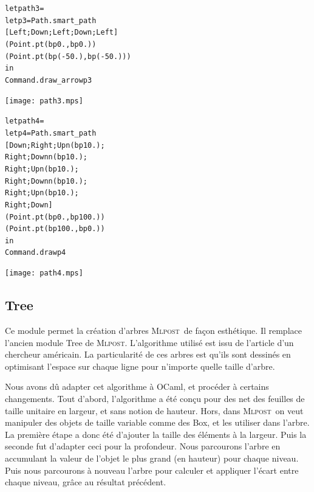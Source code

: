 \documentclass[a4paper,12pt]{article}
\newcommand{\mlpost}{\textsc{Mlpost}}
\begin{document}
\bigskip
\begin{minipage}{0.5\linewidth}
  \begin{alltt}
    let path3 = 
    let p3 = Path.smart_path 
    [Left;Down;Left;Down;Left] 
    (Point.pt (bp 0.,bp 0.)) 
    (Point.pt (bp (-50.),bp (-50.)))
    in
    Command.draw_arrow p3
  \end{alltt}
\end{minipage}
\begin{minipage}{0.5\linewidth}
\begin{center}
\texttt{[image: path3.mps]}
\end{center}
\end{minipage}

\bigskip
\begin{minipage}{0.5\linewidth}
  \begin{alltt}
    let path4 = 
    let p4 = Path.smart_path 
    [Down;Right;Upn (bp 10.);
      Right;Downn (bp 10.);
      Right;Upn (bp 10.);
      Right;Downn (bp 10.);
      Right;Upn (bp 10.);
      Right;Down]
    (Point.pt (bp 0.,bp 100.)) 
    (Point.pt (bp 100.,bp 0.))
    in
    Command.draw p4
  \end{alltt}
\end{minipage}
\begin{minipage}{0.5\linewidth}
\begin{center}
\texttt{[image: path4.mps]}
\end{center}
\end{minipage}


\subsection{Tree}
Ce module permet la création d'arbres \mlpost\ de façon esthétique.
Il remplace l'ancien module Tree de \mlpost. L'algorithme utilisé est issu de l'article d'un chercheur américain\cite{tree}.
La particularité de ces arbres est qu'ils sont dessinés en optimisant l'espace sur chaque ligne pour n'importe quelle taille d'arbre.
\bigskip 

Nous avons dû adapter cet algorithme à OCaml, et procéder à certains changements. Tout d'abord, l'algorithme a été conçu pour des n\oeuds et des feuilles de taille unitaire en largeur, et sans notion de hauteur. Hors, dans \mlpost\ on veut manipuler des objets de taille variable comme des Box, et les utiliser dans l'arbre. La première étape a donc été d'ajouter la taille des éléments à la largeur. Puis la seconde fut d'adapter ceci pour la profondeur. Nous parcourons l'arbre en accumulant la valeur de l'objet le plus grand (en hauteur) pour chaque niveau. Puis nous parcourons à nouveau l'arbre pour calculer et appliquer l'écart entre chaque niveau, grâce au résultat précédent.
\bigskip 
\end{document}
